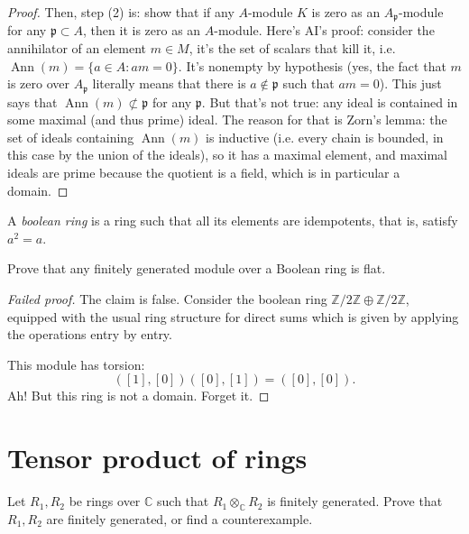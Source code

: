 \begin{proof}
Then, step (2) is:
show that if any $A$-module $K$
is zero as an $A_{\mathfrak{p}}$-module
for any $\mathfrak{p}\subset A$,
then it is zero as an $A$-module.
Here's AI's proof: consider the annihilator
of an element $m \in M$, it's the
set of scalars that kill it, i.e.
$\operatorname{Ann}(m) =
\{a \in A: am=0\}$. It's nonempty by
hypothesis (yes, the fact that $m$ is
zero over $A_{\mathfrak{p}}$ literally
means that there is $a \not\in \mathfrak{p}$
such that $a m =0$).
This just says that $\operatorname{Ann}(m)
\not\subset \mathfrak{p}$ for any
$\mathfrak{p}$.
But that's not true: any ideal is
contained in some maximal (and thus prime)
ideal. The reason for that is Zorn's lemma:
the set of ideals containing
$\operatorname{Ann}(m)$ is inductive
(i.e. every chain is bounded, in this case
by the union of the ideals), so it has
a maximal element, and maximal ideals
are prime because the quotient is a field,
which is in particular a domain.
 
\end{proof}

\begin{definition}
\label{definition-boolean-ring}
A {\it boolean ring} is a ring such
that all its elements are idempotents,
that is, satisfy $a^2=a$.
\end{definition}

\begin{exercise}
\label{exercise-boolean-ring-flat}
Prove that any finitely generated module
over a Boolean ring is flat.
\end{exercise}

\begin{proof}[Failed proof]
The claim is false.
Consider the boolean ring
$\mathbb{Z}/2\mathbb{Z} \oplus
\mathbb{Z}/2\mathbb{Z}$,
equipped with the usual ring structure
for direct sums which is given
by applying the operations entry by entry.

This module has torsion:
$$
([1],[0])([0],[1])=([0],[0]).
$$
Ah! But this ring is not a domain. Forget it.
\end{proof}

\section{Tensor product of rings}

\begin{exercise}
\label{exercise-tensor-product-fg-or-not}
Let $R_1, R_2$ be rings over $\mathbb{C}$
such that $R_1 \otimes_{\mathbb{C}}R_2$
is finitely generated. Prove that
$R_1,R_2$ are finitely generated,
or find a counterexample.
\end{exercise}

